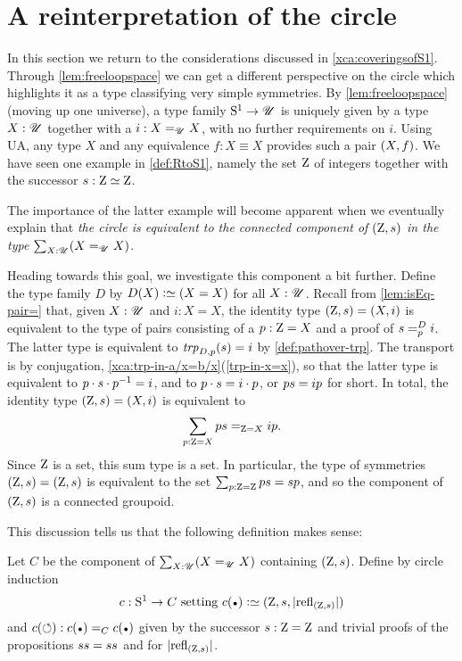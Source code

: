 \section{A reinterpretation of the circle}\label{sec:S1isC}

In this section we return to the considerations discussed in \cref{xca:coveringsofS1}.
Through \cref{lem:freeloopspace} we can get a different perspective on the circle 
which highlights it as a type classifying very simple symmetries.
By \cref{lem:freeloopspace} (moving up one universe), 
a type family ${\mathrm{S}^1}\to{\mathscr{U}}$ is uniquely given by a type $X:{\mathscr{U}}$ together 
with a $i:X=_{\mathscr{U}} X$, with no further requirements on $i$.
Using UA, any type $X$ and any equivalence $f: X\equiv X$ provides such a pair
$(X,{f})$. We have seen one example in \cref{def:RtoS1}, 
namely the set $\mathrm{Z}$ of integers together with the successor $s: \mathrm{Z}\simeq\mathrm{Z}$.

The importance of the latter example will become apparent when we eventually 
explain that \emph{the circle is equivalent to the connected component of 
$(\mathrm{Z},{s})$ in the type $\sum_{X:{\mathscr{U}}}(X=_{{\mathscr{U}}}X)$}. 

Heading towards this goal, we investigate this component a bit further.
Define the type family $D$ by $D(X) \defeq (X=X)$ for all $X:{\mathscr{U}}$.
Recall from \cref{lem:isEq-pair=} that, given $X:{\mathscr{U}}$ and $i: X=X$, 
the identity type $(\mathrm{Z},{s}) = (X,i)$
is equivalent to the type of pairs consisting of a $p:\mathrm{Z}=X$ and 
a proof of $\pathover{\etop{s}}{D}{p}{i}$. The latter type is
equivalent to $\trp[D]{p}(\etop{s}) = i$ by \cref{def:pathover-trp}.
The transport is by conjugation,
\cref{xca:trp-in-a/x=b/x}(\ref{trp-in-x=x}), so that the latter
type is equivalent to $p\cdot{s}\cdot p^{-1} = i$, 
and to $p\cdot{s} = i\cdot p$, or $p {s} = i p$ for short. 
In total, the identity type $(\mathrm{Z},{s})=(X,i)$ is equivalent to
\[
\sum_{p: {\mathrm{Z} = X}} {p {s}} =_{\mathrm{Z}=X} {i p}.
\] 
Since $\mathrm{Z}$ is a set, this sum type is a set.
In particular, the type of symmetries $(\mathrm{Z},{s})=(\mathrm{Z},{s})$
is equivalent to the set $\sum_{p:\mathrm{Z}=\mathrm{Z}}p{s}={s}p$,  
and so the component of $(\mathrm{Z},{s})$ is a connected groupoid.

This discussion tells us that the following definition makes sense:

\begin{definition}\label{def:S1toC}
Let $C$ be the component of $\sum_{X:{\mathscr{U}}}(X=_{{\mathscr{U}}}X)$ containing $(\mathrm{Z},{s})$.
Define by circle induction
\[
c:\Sc\to C \text{~setting~} 
c(\base)\defequi (\zet,\etop{s},\trunc{\refl{(\zet,\etop{s})}})
\]
and $c(\Sloop): c(\base)=_C c(\base)$ given by the successor 
${s}:\mathrm{Z}=\mathrm{Z}$ and trivial proofs of the propositions
${s}{s}={s}{s}$ and for $\trunc{\refl{(\zet,\etop{s})}}$. 
\end{definition}

